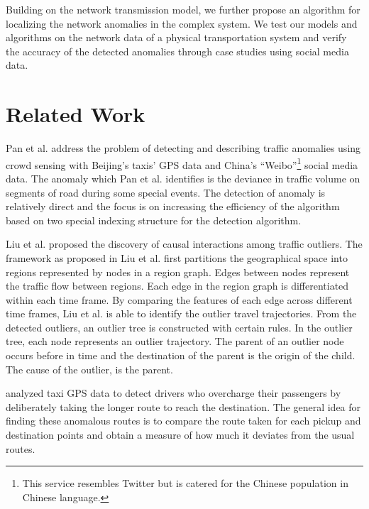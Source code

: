 \documentclass[draft]{sig-alternate}
\begin{document}
Building on the network transmission model, we further propose an algorithm for localizing the network anomalies in the complex system. We test our models and algorithms on the network data of a physical transportation system and verify the accuracy of the detected anomalies through case studies using social media data.


\section{Related Work}
\label{sec:related}


Pan et al. \cite{Pan2013} address the problem of detecting and describing traffic anomalies using crowd sensing with Beijing's taxis' GPS data and China's ``Weibo''\footnote{This service resembles Twitter but is catered for the Chinese population in Chinese language.} social media data. The anomaly which Pan et al. \cite{Pan2013} identifies is the deviance in traffic volume on segments of road during some special events. The detection of anomaly is relatively direct and the focus is on increasing the efficiency of the algorithm based on two special indexing structure for the detection algorithm.

Liu et al. \cite{Liu2011} proposed the discovery of causal interactions among traffic outliers. The framework as proposed in Liu et al.\cite{Liu2011} first partitions the geographical space into regions represented by nodes in a region graph. Edges between nodes represent the traffic flow between regions. Each edge in the region graph is differentiated within each time frame. By comparing the features of each edge across different time frames, Liu et al. is able to identify the outlier travel trajectories. From the detected outliers, an outlier tree is constructed with certain rules. In the outlier tree, each node represents an outlier trajectory. The parent of an outlier node occurs before in time and the destination of the parent is the origin of the child. The cause of the outlier, is the parent.

\cite{Ge2011,Zhang2011,Zhang2012} analyzed taxi GPS data to detect drivers who overcharge their passengers by deliberately taking the longer route to reach the destination. The general idea for finding these anomalous routes is to compare the route taken for each pickup and destination points and obtain a measure of how much it deviates from the usual routes.
\end{document}
